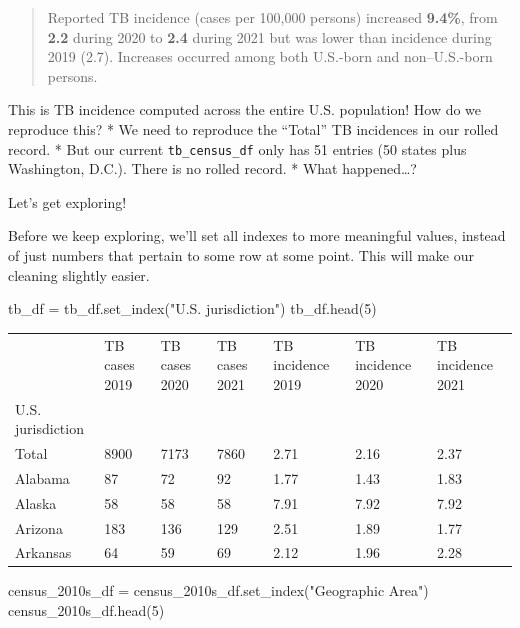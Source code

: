 \documentclass[
  letterpaper,
  DIV=11,
  numbers=noendperiod]{scrreprt}
\newenvironment{Shaded}{\begin{snugshade}}{\end{snugshade}}
\newcommand{\DecValTok}[1]{\textcolor[rgb]{0.68,0.00,0.00}{#1}}
\newcommand{\NormalTok}[1]{\textcolor[rgb]{0.00,0.23,0.31}{#1}}
\newcommand{\OperatorTok}[1]{\textcolor[rgb]{0.37,0.37,0.37}{#1}}
\newcommand{\StringTok}[1]{\textcolor[rgb]{0.13,0.47,0.30}{#1}}
\begin{document}
\begin{quote}
Reported TB incidence (cases per 100,000 persons) increased
\textbf{9.4\%}, from \textbf{2.2} during 2020 to \textbf{2.4} during
2021 but was lower than incidence during 2019 (2.7). Increases occurred
among both U.S.-born and non--U.S.-born persons.
\end{quote}

This is TB incidence computed across the entire U.S. population! How do
we reproduce this? * We need to reproduce the ``Total'' TB incidences in
our rolled record. * But our current \texttt{tb\_census\_df} only has 51
entries (50 states plus Washington, D.C.). There is no rolled record. *
What happened\ldots?

Let's get exploring!

Before we keep exploring, we'll set all indexes to more meaningful
values, instead of just numbers that pertain to some row at some point.
This will make our cleaning slightly easier.

\begin{Shaded}
\begin{Highlighting}[]
\NormalTok{tb\_df }\OperatorTok{=}\NormalTok{ tb\_df.set\_index(}\StringTok{"U.S. jurisdiction"}\NormalTok{)}
\NormalTok{tb\_df.head(}\DecValTok{5}\NormalTok{)}
\end{Highlighting}
\end{Shaded}

\begin{longtable}[]{@{}lllllll@{}}
\toprule\noalign{}
& TB cases 2019 & TB cases 2020 & TB cases 2021 & TB incidence 2019 & TB
incidence 2020 & TB incidence 2021 \\
U.S. jurisdiction & & & & & & \\
\midrule\noalign{}
\endhead
\bottomrule\noalign{}
\endlastfoot
Total & 8900 & 7173 & 7860 & 2.71 & 2.16 & 2.37 \\
Alabama & 87 & 72 & 92 & 1.77 & 1.43 & 1.83 \\
Alaska & 58 & 58 & 58 & 7.91 & 7.92 & 7.92 \\
Arizona & 183 & 136 & 129 & 2.51 & 1.89 & 1.77 \\
Arkansas & 64 & 59 & 69 & 2.12 & 1.96 & 2.28 \\
\end{longtable}

\begin{Shaded}
\begin{Highlighting}[]
\NormalTok{census\_2010s\_df }\OperatorTok{=}\NormalTok{ census\_2010s\_df.set\_index(}\StringTok{"Geographic Area"}\NormalTok{)}
\NormalTok{census\_2010s\_df.head(}\DecValTok{5}\NormalTok{)}
\end{Highlighting}
\end{Shaded}
\end{document}
